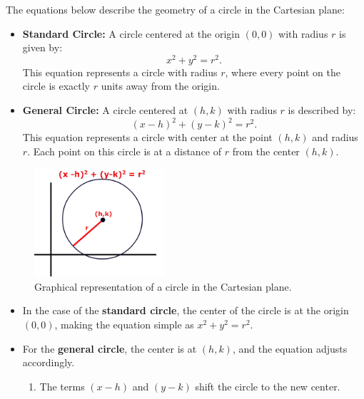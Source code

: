 \documentclass{article}
\begin{document}
\begin{theorembox}
    The equations below describe the geometry of a circle in the Cartesian plane:
    
    \begin{itemize}
        \item \textbf{Standard Circle:} A circle centered at the origin \((0, 0)\) with radius \(r\) is given by:
        \[
            x^2 + y^2 = r^2.
        \]
        This equation represents a circle with radius \(r\), where every point on the circle is exactly \(r\) units away from the origin.

        \item \textbf{General Circle:} A circle centered at \((h, k)\) with radius \(r\) is described by:
        \[
            (x - h)^2 + (y - k)^2 = r^2.
        \]
        This equation represents a circle with center at the point \((h, k)\) and radius \(r\). Each point on this circle is at a distance of \(r\) from the center \((h, k)\).
    \end{itemize}
    
    \begin{figure}[H]
        \centering
        \includegraphics[width=0.43\textwidth]{equation of a circle.png}
        \caption{Graphical representation of a circle in the Cartesian plane.}
        \label{fig:sample_image1}
    \end{figure}

    \begin{notebox}
        \begin{itemize}
            \item In the case of the \textbf{standard circle}, the center of the circle is at the origin \((0, 0)\), making the equation simple as \(x^2 + y^2 = r^2\).
            \item For the \textbf{general circle}, the center is at \((h, k)\), and the equation adjusts accordingly.
            \begin{enumerate}
                \item[\labelitemi] The terms \((x - h)\) and \((y - k)\) shift the circle to the new center.
            \end{enumerate}
        \end{itemize}
    \end{notebox}
\end{theorembox}
\end{document}
